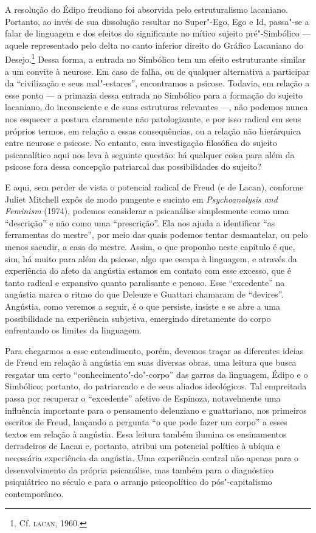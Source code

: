 A resolução do Édipo freudiano foi absorvida pelo estruturalismo
lacaniano. Portanto, ao invés de sua dissolução resultar no Super"-Ego,
Ego e Id, passa"-se a falar de linguagem e dos efeitos do significante no
mítico sujeito pré"-Simbólico --- aquele representado pelo delta no canto
inferior direito do Gráfico Lacaniano do Desejo.\footnote{Cf. \textsc{lacan}, 1960.} Dessa
forma, a entrada no Simbólico tem um efeito estruturante similar a um
convite à neurose. Em caso de falha, ou de qualquer alternativa a
participar da ``civilização e seus mal"-estares'', encontramos a psicose.
Todavia, em relação a esse ponto --- a primazia dessa entrada no
Simbólico para a formação do sujeito lacaniano, do inconsciente e de
suas estruturas relevantes ---, não podemos nunca nos esquecer a postura
claramente não patologizante, e por isso radical em seus próprios
termos, em relação a essas consequências, ou a relação não hierárquica
entre neurose e psicose. No entanto, essa investigação filosófica do
sujeito psicanalítico aqui nos leva à seguinte questão: há qualquer
coisa para além da psicose fora dessa concepção patriarcal das
possibilidades do sujeito?

E aqui, sem perder de vista o potencial radical de Freud (e de Lacan),
conforme Juliet Mitchell expôs de modo pungente e sucinto em
\emph{Psychoanalysis and Feminism} (1974), podemos considerar a
psicanálise simplesmente como uma ``descrição'' e não como uma
``prescrição''. Ela nos ajuda a identificar ``as ferramentas do
mestre'', por meio das quais podemos tentar desmantelar, ou pelo menos
sacudir, a casa do mestre. Assim, o que proponho neste capítulo é que,
sim, há muito para além da psicose, algo que escapa à linguagem, e
através da experiência do afeto da angústia estamos em contato com esse
excesso, que é tanto radical e expansivo quanto paralisante e penoso.
Esse ``excedente'' na angústia marca o ritmo do que Deleuze e Guattari
chamaram de ``devires''. Angústia, como veremos a seguir, é o que
persiste, insiste e se abre a uma possibilidade na experiência
subjetiva, emergindo diretamente do corpo enfrentando os limites da
linguagem.

Para chegarmos a esse entendimento, porém, devemos traçar as diferentes
ideias de Freud em relação à angústia em suas diversas obras, uma
leitura que busca resgatar um certo ``conhecimento"-do"-corpo'' das garras
da linguagem, Édipo e o Simbólico; portanto, do patriarcado e de seus
aliados ideológicos. Tal empreitada passa por recuperar o ``excedente''
afetivo de Espinoza, notavelmente uma influência importante para o
pensamento deleuziano e guattariano, nos primeiros escritos de Freud,
lançando a pergunta ``o que pode fazer um corpo'' a esses textos em
relação à angústia. Essa leitura também ilumina os ensinamentos
derradeiros de Lacan e, portanto, atribui um potencial político à ubíqua
e necessária experiência da angústia. Uma experiência central não apenas
para o desenvolvimento da própria psicanálise, mas também para o
diagnóstico psiquiátrico no século  e para o arranjo psicopolítico do
pós"-capitalismo contemporâneo.

